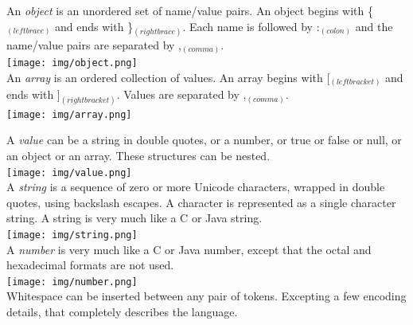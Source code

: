 \documentclass[11pt,twoside,a4paper]{article}
\begin{document}
	An \emph{object} is an unordered set of name/value pairs. An object begins with \{$_{(left brace)}$ and ends with \}$_{(right brace)}$. Each name is followed by :$_{(colon)}$ and the name/value pairs are separated by ,$_{(comma)}$.~\\
	
	\texttt{[image: img/object.png]}~\\
	
	An \emph{array} is an ordered collection of values. An array begins with [$_{(left bracket)}$ and ends with ]$_{(right bracket)}$. Values are separated by ,$_{(comma)}$.~\\
	
	\texttt{[image: img/array.png]}~\\

\begin{minipage}[h]{0.70\textwidth}
	\small
	A \emph{value} can be a string in double quotes, or a number, or true or false or null, or an object or an array. These structures can be nested.~\\
	
	\texttt{[image: img/value.png]}~\\
	
	A \emph{string} is a sequence of zero or more Unicode characters, wrapped in double quotes, using backslash escapes. A character is represented as a single character string. A string is very much like a C or Java string.~\\
	
	\texttt{[image: img/string.png]}~\\
	
	A \emph{number} is very much like a C or Java number, except that the octal and hexadecimal formats are not used.~\\
	
	\texttt{[image: img/number.png]}~\\
	
	Whitespace can be inserted between any pair of tokens. Excepting a few encoding details, that completely describes the language.~\\


\end{minipage}
\end{document}
